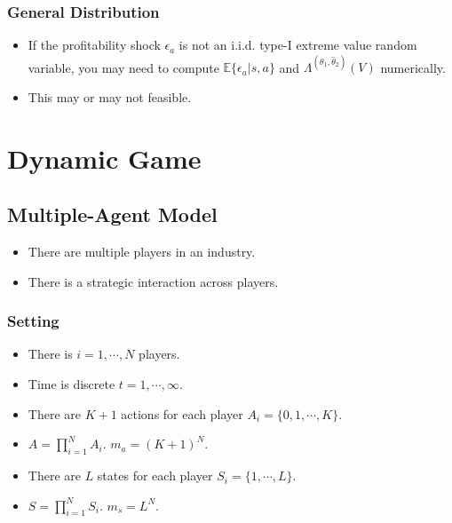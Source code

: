 \documentclass[]{book}
\providecommand{\tightlist}{%
  \setlength{\itemsep}{0pt}\setlength{\parskip}{0pt}}
\begin{document}
\subsection{General Distribution}\label{general-distribution}

\begin{itemize}
\tightlist
\item
  If the profitability shock \(\epsilon_a\) is not an i.i.d. type-I
  extreme value random variable, you may need to compute
  \(\mathbb{E}\{\epsilon_a|s, a\}\) and
  \(\Lambda^{(\theta_1, \hat{\theta}_2)}(V)\) numerically.
\item
  This may or may not feasible.
\end{itemize}

\chapter{Dynamic Game}\label{dynamicgame}

\section{Multiple-Agent Model}\label{multiple-agent-model}

\begin{itemize}
\tightlist
\item
  There are multiple players in an industry.
\item
  There is a strategic interaction across players.
\end{itemize}

\subsection{Setting}\label{setting-1}

\begin{itemize}
\tightlist
\item
  There is \(i = 1, \cdots, N\) players.
\item
  Time is discrete \(t = 1, \cdots, \infty\).
\item
  There are \(K + 1\) actions for each player
  \(A_i = \{0, 1, \cdots, K\}\).
\item
  \(A = \prod_{i = 1}^N A_i\). \(m_a = (K + 1)^N\).
\item
  There are \(L\) states for each player \(S_i = \{1, \cdots, L\}\).
\item
  \(S = \prod_{i = 1}^N S_i\). \(m_s = L^N\).
\end{itemize}
\end{document}
